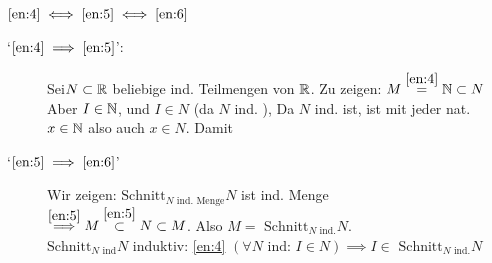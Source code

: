 \documentclass[consecutivenumbering]{gadsescript}
\begin{document}
$\ref{en:4} \iff \ref{en:5} \iff \ref{en:6}$
\begin{subproof}
	\begin{description}
		\item[`$\ref{en:4} \implies \ref{en:5}$':] Sei$ N \subset \mathbb{R} $ beliebige ind. Teilmengen von $\mathbb{R}$. Zu zeigen: $ M \overset{\ref{en:4}}{=} \mathbb{N} \subset N $\\
		Aber $ I \in \mathbb{N} $, und $ I \in N $ (da $ N $ ind. ), Da $ N $ ind. ist, ist mit jeder nat. $ x \in \mathbb{N} $ also auch $ x \in N $. Damit \\
	\item[`$\ref{en:5} \implies \ref{en:6}$'] Wir zeigen: $\text{Schnitt}_{N \text{ ind. Menge}} N $ ist ind. Menge\\
		$\overset{\ref{en:5}}{\implies} M \overset{\ref{en:5}}{\subset} N \subset M $. Also $ M = \text{ Schnitt}_{N \text{ ind.}} N $.\\
			$\text{Schnitt}_{N \text{ ind}} N $ induktiv: \ref{en:4} $ ( \forall N \text{ ind: } I \in N) \implies I \in \text{ Schnitt}_{N \text{ ind.}} N $
	\end{description}

\end{subproof}
\end{document}
